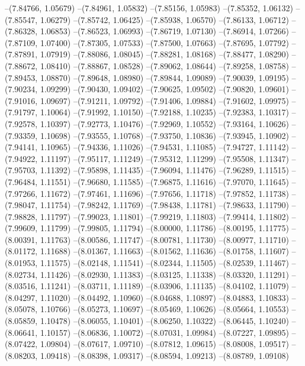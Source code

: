 --(7.84766, 1.05679)
--(7.84961, 1.05832)
--(7.85156, 1.05983)
--(7.85352, 1.06132)
--(7.85547, 1.06279)
--(7.85742, 1.06425)
--(7.85938, 1.06570)
--(7.86133, 1.06712)
--(7.86328, 1.06853)
--(7.86523, 1.06993)
--(7.86719, 1.07130)
--(7.86914, 1.07266)
--(7.87109, 1.07400)
--(7.87305, 1.07533)
--(7.87500, 1.07663)
--(7.87695, 1.07792)
--(7.87891, 1.07919)
--(7.88086, 1.08045)
--(7.88281, 1.08168)
--(7.88477, 1.08290)
--(7.88672, 1.08410)
--(7.88867, 1.08528)
--(7.89062, 1.08644)
--(7.89258, 1.08758)
--(7.89453, 1.08870)
--(7.89648, 1.08980)
--(7.89844, 1.09089)
--(7.90039, 1.09195)
--(7.90234, 1.09299)
--(7.90430, 1.09402)
--(7.90625, 1.09502)
--(7.90820, 1.09601)
--(7.91016, 1.09697)
--(7.91211, 1.09792)
--(7.91406, 1.09884)
--(7.91602, 1.09975)
--(7.91797, 1.10064)
--(7.91992, 1.10150)
--(7.92188, 1.10235)
--(7.92383, 1.10317)
--(7.92578, 1.10397)
--(7.92773, 1.10476)
--(7.92969, 1.10552)
--(7.93164, 1.10626)
--(7.93359, 1.10698)
--(7.93555, 1.10768)
--(7.93750, 1.10836)
--(7.93945, 1.10902)
--(7.94141, 1.10965)
--(7.94336, 1.11026)
--(7.94531, 1.11085)
--(7.94727, 1.11142)
--(7.94922, 1.11197)
--(7.95117, 1.11249)
--(7.95312, 1.11299)
--(7.95508, 1.11347)
--(7.95703, 1.11392)
--(7.95898, 1.11435)
--(7.96094, 1.11476)
--(7.96289, 1.11515)
--(7.96484, 1.11551)
--(7.96680, 1.11585)
--(7.96875, 1.11616)
--(7.97070, 1.11645)
--(7.97266, 1.11672)
--(7.97461, 1.11696)
--(7.97656, 1.11718)
--(7.97852, 1.11738)
--(7.98047, 1.11754)
--(7.98242, 1.11769)
--(7.98438, 1.11781)
--(7.98633, 1.11790)
--(7.98828, 1.11797)
--(7.99023, 1.11801)
--(7.99219, 1.11803)
--(7.99414, 1.11802)
--(7.99609, 1.11799)
--(7.99805, 1.11794)
--(8.00000, 1.11786)
--(8.00195, 1.11775)
--(8.00391, 1.11763)
--(8.00586, 1.11747)
--(8.00781, 1.11730)
--(8.00977, 1.11710)
--(8.01172, 1.11688)
--(8.01367, 1.11663)
--(8.01562, 1.11636)
--(8.01758, 1.11607)
--(8.01953, 1.11575)
--(8.02148, 1.11541)
--(8.02344, 1.11505)
--(8.02539, 1.11467)
--(8.02734, 1.11426)
--(8.02930, 1.11383)
--(8.03125, 1.11338)
--(8.03320, 1.11291)
--(8.03516, 1.11241)
--(8.03711, 1.11189)
--(8.03906, 1.11135)
--(8.04102, 1.11079)
--(8.04297, 1.11020)
--(8.04492, 1.10960)
--(8.04688, 1.10897)
--(8.04883, 1.10833)
--(8.05078, 1.10766)
--(8.05273, 1.10697)
--(8.05469, 1.10626)
--(8.05664, 1.10553)
--(8.05859, 1.10478)
--(8.06055, 1.10401)
--(8.06250, 1.10322)
--(8.06445, 1.10240)
--(8.06641, 1.10157)
--(8.06836, 1.10072)
--(8.07031, 1.09984)
--(8.07227, 1.09895)
--(8.07422, 1.09804)
--(8.07617, 1.09710)
--(8.07812, 1.09615)
--(8.08008, 1.09517)
--(8.08203, 1.09418)
--(8.08398, 1.09317)
--(8.08594, 1.09213)
--(8.08789, 1.09108)
